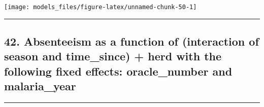 \documentclass[]{article}
\begin{document}
\begin{center}\texttt{[image: models\_files/figure-latex/unnamed-chunk-50-1]} \end{center}

\newpage

\begin{center}\rule{0.5\linewidth}{\linethickness}\end{center}

\subsection{42. Absenteeism as a function of (interaction of season and
time\_since) + herd with the following fixed effects: oracle\_number and
malaria\_year}\label{absenteeism-as-a-function-of-interaction-of-season-and-time_since-herd-with-the-following-fixed-effects-oracle_number-and-malaria_year}

\begin{center}\rule{0.5\linewidth}{\linethickness}\end{center}
\end{document}
